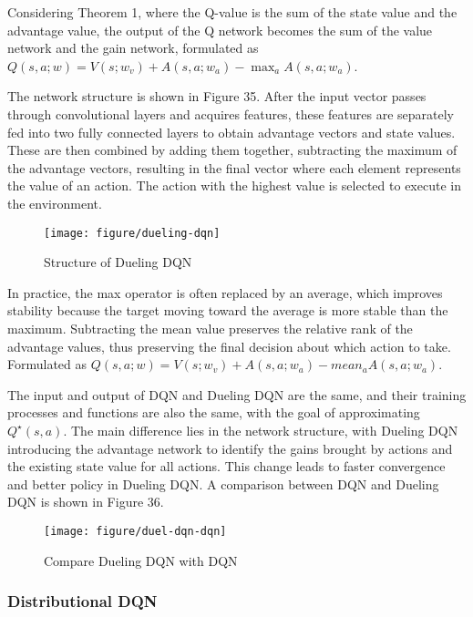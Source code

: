 \documentclass{article}
\begin{document}
Considering Theorem 1, where the Q-value is the sum of the state value and the advantage value, the output of the Q network becomes the sum of the value network and the gain network, formulated as $Q(s,a;w) = V(s;w_v) + A(s,a;w_a) - \max_a A(s,a;w_a)$.

The network structure is shown in Figure 35. After the input vector passes through convolutional layers and acquires features, these features are separately fed into two fully connected layers to obtain advantage vectors and state values. These are then combined by adding them together, subtracting the maximum of the advantage vectors, resulting in the final vector where each element represents the value of an action. The action with the highest value is selected to execute in the environment.

\begin{figure}[htbp]
        \centering
        \texttt{[image: figure/dueling-dqn]}
        \caption{Structure of Dueling DQN}
\end{figure}


In practice, the max operator is often replaced by an average, which improves stability because the target moving toward the average is more stable than the maximum. Subtracting the mean value preserves the relative rank of the advantage values, thus preserving the final decision about which action to take. Formulated as $Q(s,a;w) = V(s;w_v) + A(s,a;w_a) - mean_a A(s,a;w_a)$.

The input and output of DQN and Dueling DQN are the same, and their training processes and functions are also the same, with the goal of approximating $Q^{\star}(s,a)$. The main difference lies in the network structure, with Dueling DQN introducing the advantage network to identify the gains brought by actions and the existing state value for all actions. This change leads to faster convergence and better policy in Dueling DQN. A comparison between DQN and Dueling DQN is shown in Figure 36.

\begin{figure}[htbp]
        \centering
        \texttt{[image: figure/duel-dqn-dqn]}
        \caption{Compare Dueling DQN with DQN}
\end{figure}


\newpage
\subsubsection{Distributional DQN}
\end{document}
